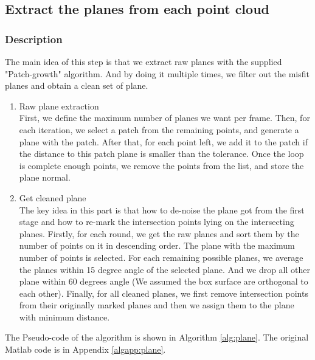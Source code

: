 \documentclass[10pt,a4paper]{article}
\begin{document}

\newpage

\subsection{Extract the planes from each point cloud}  
\subsubsection{Description}
The main idea of this step is that we extract raw planes with the supplied "Patch-growth" algorithm.
And by doing it multiple times, we filter out the misfit planes and obtain a clean set of plane. 
\begin{enumerate}[1.]
	\item Raw plane extraction \\
First, we define the maximum number of planes we want per frame. 
Then, for each iteration, we select a patch from the remaining points, and generate a plane with the patch. 
After that, for each point left, we add it to the patch if the distance to this patch plane is smaller than the tolerance.
Once the loop is complete enough points, we remove the points from the list, and store the plane normal. 
	
	\item Get cleaned plane \\
The key idea in this part is that how to de-noise the plane got from the first stage and how to re-mark the intersection points lying on the intersecting planes. 
Firstly, for each round, we get the raw planes and sort them by the number of points on it in descending order. 
The plane with the maximum number of points is selected. 
For each remaining possible planes, we average the planes within 15 degree angle of the selected plane.
And we drop all other plane within 60 degrees angle (We assumed the box surface are orthogonal to each other).
Finally, for all cleaned planes, we first remove intersection points from their originally marked planes and then we assign them to the plane with minimum distance. 

\end{enumerate}


The Pseudo-code of the algorithm is shown in Algorithm \ref{alg:plane}. 
The original Matlab code is in Appendix \ref{algapp:plane}.
\end{document}
